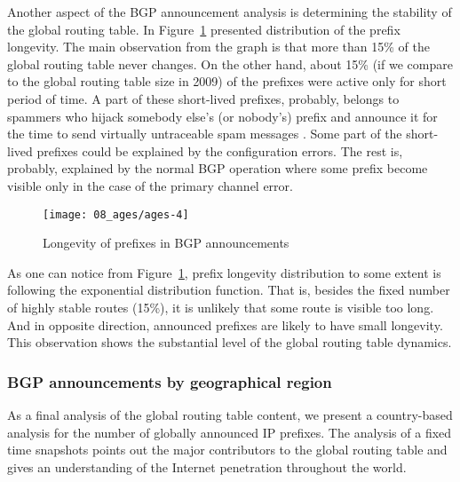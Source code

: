 Another aspect of the BGP announcement analysis is determining the stability
of the global routing table. In Figure~\ref{fig:bgp ages} presented
distribution of the prefix longevity. The main observation from the graph is
that more than 15\% of the global routing table never changes. On the other
hand, about 15\% (if we compare to the global routing table size in 2009) of
the prefixes were active only for short period of time. A part of these
short-lived prefixes, probably, belongs to spammers who hijack somebody else's
(or nobody's) prefix and announce it for the time to send virtually
untraceable spam messages
\cite{Ramachandran:2006:Understanding-the-network-level}. Some part of the
short-lived prefixes could be explained by the configuration errors. The rest
is, probably, explained by the normal BGP operation where some prefix become
visible only in the case of the primary channel error.

\begin{figure}[htbp]
	\centering
		\texttt{[image: 08\_ages/ages-4]}
	\caption{Longevity of prefixes in BGP announcements}
	\label{fig:bgp ages}
\end{figure}

As one can notice from Figure~\ref{fig:bgp ages}, prefix longevity
distribution to some extent is following the exponential distribution
function. That is, besides the fixed number of highly stable routes (15\%), it
is unlikely that some route is visible too long. And in opposite direction,
announced prefixes are likely to have small longevity. This observation shows
the substantial level of the global routing table dynamics.

\subsubsection{BGP announcements by geographical region}

As a final analysis of the global routing table content, we present a country-based analysis for the number of globally announced IP prefixes. The analysis of a fixed time snapshots points out the major contributors to the global routing table and gives an understanding of the Internet penetration throughout the world.

